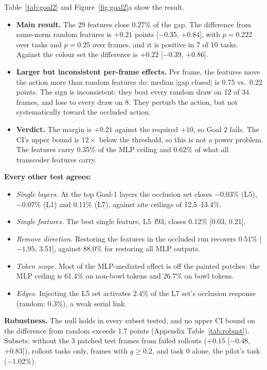\documentclass{article} %
\begin{document}
Table~\ref{tab:goal2} and Figure~\ref{fig:goal2}a show the result.
\begin{itemize}[leftmargin=*,itemsep=1pt,topsep=2pt]
  \item \textbf{Main result.} The 29 features close 0.27\% of the gap. The difference from same-norm random features is $+0.21$ points [$-0.35$, $+0.84$], with $p{=}0.222$ over tasks and $p{=}0.25$ over frames, and it is positive in 7 of 10 tasks. Against the colour set the difference is $+0.22$ [$-0.39$, $+0.86$].
  \item \textbf{Larger but inconsistent per-frame effects.} Per frame, the features move the action more than random features do: median $|$gap closed$|$ is 0.75 vs.\ 0.22 points. The sign is inconsistent: they beat every random draw on 12 of 34 frames, and lose to every draw on 8. They perturb the action, but not systematically toward the occluded action.
  \item \textbf{Verdict.} The margin is $+0.21$ against the required $+10$, so Goal 2 fails. The CI's upper bound is $12\times$ below the threshold, so this is not a power problem. The features carry 0.35\% of the MLP ceiling and 0.62\% of what all transcoder features carry.
\end{itemize}

\textbf{Every other test agrees:}
\begin{itemize}[leftmargin=*,itemsep=0pt,topsep=1pt]
  \item \emph{Single layers.} At the top Goal-1 layers the occlusion set closes $-0.03$\% (L5), $-0.07$\% (L1) and 0.11\% (L7), against site ceilings of 12.5--13.4\%.
  \item \emph{Single features.} The best single feature, L5~f93, closes 0.12\% [0.03, 0.21].
  \item \emph{Remove direction.} Restoring the features in the occluded run recovers 0.51\% [$-1.95$, 3.51], against 88.0\% for restoring all MLP outputs.
  \item \emph{Token scope.} Most of the MLP-mediated effect is off the painted patches: the MLP ceiling is 61.4\% on non-bowl tokens and 26.7\% on bowl tokens.
  \item \emph{Edges.} Injecting the L5 set activates 2.4\% of the L7 set's occlusion response (random: 0.3\%), a weak serial link.
\end{itemize}

\textbf{Robustness.} The null holds in every subset tested, and no upper CI bound on the difference from random exceeds 1.7 points (Appendix Table~\ref{tab:robust}). Subsets: without the 3 patched test frames from failed rollouts ($+0.15$ [$-0.48$, $+0.83$]), rollout tasks only, frames with $g\ge0.2$, and task 0 alone, the pilot's task ($-1.02$\%).
\end{document}
